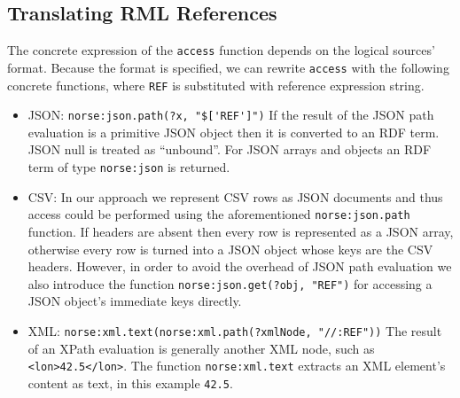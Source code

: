 

\subsection{Translating RML References}
\label{sec:rml-ref-to-sparql}
The concrete expression of the \texttt{access} function depends on the logical sources' format. Because the format is specified, we can rewrite \texttt{access} with the following concrete functions, where \texttt{REF} is substituted with reference expression string.%
\begin{itemize}
    \item JSON: \lstinline{norse:json.path(?x, "$['REF']")} If the result of the JSON path evaluation is a primitive JSON object then it is converted to an RDF term. JSON null is treated as ``unbound''. For JSON arrays and objects an RDF term of type \lstinline{norse:json} is returned.
    \item CSV: In our approach we represent CSV rows as JSON documents and thus access could be performed using the aforementioned \texttt{norse:json.path} function.
    If headers are absent then every row is represented as a JSON array, otherwise every row is turned into a JSON object whose keys are the CSV headers.
    However, in order to avoid the overhead of JSON path evaluation we also introduce the function \lstinline{norse:json.get(?obj, "REF")} for accessing a JSON object's immediate keys directly.
    \item XML: \lstinline{norse:xml.text(norse:xml.path(?xmlNode, "//:REF"))} The result of an XPath evaluation is generally another XML node, such as \lstinline{<lon>42.5</lon>}. The function \lstinline{norse:xml.text} extracts an XML element's content as text, in this example \lstinline{42.5}.
\end{itemize}



